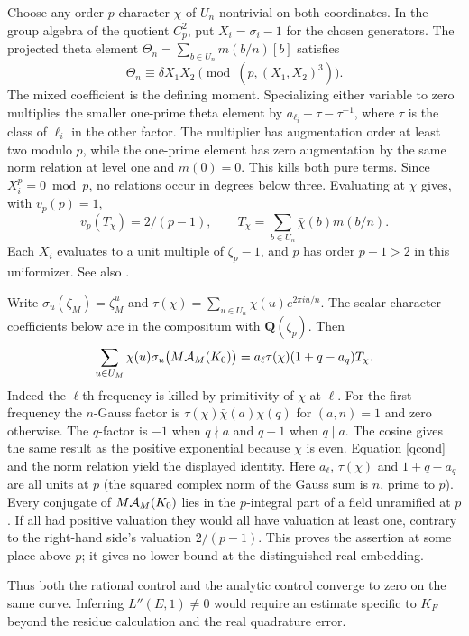 \documentclass[11pt]{article}
\newcommand{\Q}{\mathbf Q}\newcommand{\R}{\mathbf R}\newcommand{\Z}{\mathbf Z}
\begin{document}
Choose any order-$p$ character $\chi$ of $U_n$ nontrivial on both coordinates. In the group algebra of the quotient $C_p^2$, put $X_i=\sigma_i-1$ for the chosen generators. The projected theta element $\Theta_n=\sum_{b\in U_n}m(b/n)[b]$ satisfies
\[
 \Theta_n\equiv\delta X_1X_2\pmod{(p,(X_1,X_2)^3)}.
\]
The mixed coefficient is the defining moment. Specializing either variable to zero multiplies the smaller one-prime theta element by $a_{\ell_i}-\tau-\tau^{-1}$, where $\tau$ is the class of $\ell_i$ in the other factor. The multiplier has augmentation order at least two modulo $p$, while the one-prime element has zero augmentation by the same norm relation at level one and $m(0)=0$. This kills both pure terms. Since $X_i^p=0\bmod p$, no relations occur in degrees below three. Evaluating at $\bar\chi$ gives, with $v_p(p)=1$,
\[
 v_p(T_\chi)=2/(p-1),\qquad T_\chi=\sum_{b\in U_n}\bar\chi(b)m(b/n).
\]
Each $X_i$ evaluates to a unit multiple of $\zeta_p-1$, and $p$ has order $p-1>2$ in this uniformizer. See also \cite{previous}.

Write $\sigma_u(\zeta_M)=\zeta_M^u$ and $\tau(\chi)=\sum_{u\in U_n}\chi(u)e^{2\pi i u/n}$. The scalar character coefficients below are in the compositum with $\Q(\zeta_p)$. Then
\[
 \sum_{u\in U_M}\chi(u)\sigma_u\big(M\mathcal A_M(K_0)\big)
                =a_\ell\tau(\chi)(1+q-a_q)T_\chi .
\]
Indeed the $\ell$th frequency is killed by primitivity of $\chi$ at $\ell$. For the first frequency the $n$-Gauss factor is $\tau(\chi)\bar\chi(a)\chi(q)$ for $(a,n)=1$ and zero otherwise. The $q$-factor is $-1$ when $q\nmid a$ and $q-1$ when $q\mid a$. The cosine gives the same result as the positive exponential because $\chi$ is even. Equation \eqref{qcond} and the norm relation yield the displayed identity. Here $a_\ell$, $\tau(\chi)$ and $1+q-a_q$ are all units at $p$ (the squared complex norm of the Gauss sum is $n$, prime to $p$). Every conjugate of $M\mathcal A_M(K_0)$ lies in the $p$-integral part of a field unramified at $p$. If all had positive valuation they would all have valuation at least one, contrary to the right-hand side's valuation $2/(p-1)$. This proves the assertion at some place above $p$; it gives no lower bound at the distinguished real embedding.

Thus both the rational control and the analytic control converge to zero on the same curve. Inferring $L''(E,1)\ne0$ would require an estimate specific to $K_F$ beyond the residue calculation and the real quadrature error.
\end{document}
